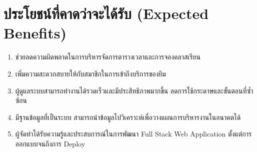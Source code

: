 \section{ประโยชน์ที่คาดว่าจะได้รับ (Expected Benefits)}
\begin{enumerate}
    \item ช่วยลดความผิดพลาดในการบริหารจัดการตารางเวลาและการจองคลาสเรียน
    \item เพิ่มความสะดวกสบายให้กับสมาชิกในการเข้าถึงบริการของยิม
    \item ผู้ดูแลระบบสามารถทำงานได้รวดเร็วและมีประสิทธิภาพมากขึ้น ลดการใช้กระดาษและขั้นตอนที่ซ้ำซ้อน
    \item มีฐานข้อมูลที่เป็นระบบ สามารถนำข้อมูลไปวิเคราะห์เพื่อวางแผนการบริหารงานในอนาคตได้
    \item ผู้จัดทำได้รับความรู้และประสบการณ์ในการพัฒนา Full Stack Web Application ตั้งแต่การออกแบบจนถึงการ Deploy
\end{enumerate}
